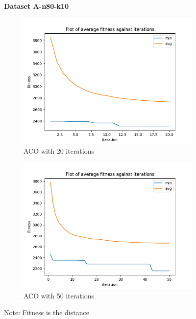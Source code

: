 \documentclass{article}
\begin{document}
\begin{figure}[H]
  \centering
  \textbf{Dataset A-n80-k10}
  \begin{subfigure}{.5\textwidth}
    \centering
    \includegraphics[width=1\linewidth]{images/n80-k10_20.png}
    \caption{ACO with 20 iterations}
    \label{fig:n80-k10_20}
  \end{subfigure}%
  \begin{subfigure}{.5\textwidth}
    \centering
    \includegraphics[width=1\linewidth]{images/n80-k10_50.png}
    \caption{ACO with 50 iterations}
    \label{fig:n80-k10_50}
  \end{subfigure}
  \caption{Note: Fitness is the distance}
  \label{fig:n80-k10}
\end{figure}
\end{document}
